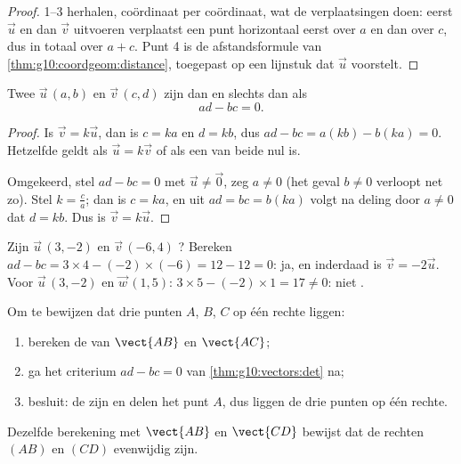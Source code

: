 \begin{proof}
1--3 herhalen, coördinaat per coördinaat, wat de verplaatsingen doen: eerst
$\vec u$ en dan $\vec v$ uitvoeren verplaatst een punt horizontaal eerst over
$a$ en dan over $c$, dus in totaal over $a + c$. Punt 4 is de afstandsformule
van \cref{thm:g10:coordgeom:distance}, toegepast op een lijnstuk dat
$\vec u$ voorstelt.
\end{proof}

\begin{theorem}\label{thm:g10:vectors:det}
Twee  $\vec u\,(a, b)$ en $\vec v\,(c, d)$ zijn  dan en
slechts dan als
\[
ad - bc = 0 .
\]
\end{theorem}

\begin{proof}
Is $\vec v = k\vec u$, dan is $c = ka$ en $d = kb$, dus
$ad - bc = a(kb) - b(ka) = 0$. Hetzelfde geldt als $\vec u = k \vec v$ of als
een van beide  nul is.

Omgekeerd, stel $ad - bc = 0$ met $\vec u \neq \vec 0$, zeg $a \neq 0$ (het
geval $b \neq 0$ verloopt net zo). Stel $k = \frac{c}{a}$; dan is $c = ka$,
en uit $ad = bc = b(ka)$ volgt na deling door $a \neq 0$ dat $d = kb$. Dus is
$\vec v = k\vec u$.
\end{proof}

\begin{example}\label{ex:g10:vectors:det}
Zijn $\vec u\,(3, -2)$ en $\vec v\,(-6, 4)$ ? Bereken
$ad - bc = 3 \times 4 - (-2)\times(-6) = 12 - 12 = 0$: ja, en inderdaad is
$\vec v = -2\vec u$. Voor $\vec u\,(3, -2)$ en $\vec w\,(1, 5)$:
$3 \times 5 - (-2) \times 1 = 17 \neq 0$: niet .
\end{example}

\begin{method}\label{met:g10:vectors:alignment}
Om te bewijzen dat drie punten $A$, $B$, $C$ op één rechte liggen:
\begin{enumerate}
  \item bereken de  van $\vect{AB}$ en $\vect{AC}$;
  \item ga het criterium $ad - bc = 0$ van \cref{thm:g10:vectors:det} na;
  \item besluit: de  zijn  en delen het punt $A$, dus
        liggen de drie punten op één rechte.
\end{enumerate}
Dezelfde berekening met $\vect{AB}$ en $\vect{CD}$ bewijst dat de rechten
$(AB)$ en $(CD)$ evenwijdig zijn.
\end{method}


